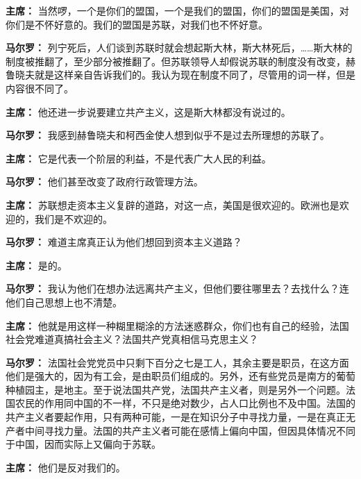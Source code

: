 \begin{list}{}
\item[\textbf{主席：}] 当然啰，一个是你们的盟国，一个是我们的盟国，你们的盟国是美国，对你们是不怀好意的。我们的盟国是苏联，对我们也不怀好意。

\item[\textbf{马尔罗：}] 列宁死后，人们谈到苏联时就会想起斯大林，斯大林死后，……斯大林的制度被推翻了，至少部分被推翻了。但苏联领导人却假说苏联的制度没有改变，赫鲁晓夫就是这样亲自告诉我们的。我认为现在制度不同了，尽管用的词一样，但是内容很不同了。

\item[\textbf{主席：}] 他还进一步说要建立共产主义，这是斯大林都没有说过的。

\item[\textbf{马尔罗：}] 我感到赫鲁晓夫和柯西金使人想到似乎不是过去所理想的苏联了。

\item[\textbf{主席：}] 它是代表一个阶层的利益，不是代表广大人民的利益。

\item[\textbf{马尔罗：}] 他们甚至改变了政府行政管理方法。

\item[\textbf{主席：}] 苏联想走资本主义复辟的道路，对这一点，美国是很欢迎的。欧洲也是欢迎的，我们是不欢迎的。

\item[\textbf{马尔罗：}] 难道主席真正认为他们想回到资本主义道路？

\item[\textbf{主席：}] 是的。

\item[\textbf{马尔罗：}] 我认为他们在想办法远离共产主义，但他们要往哪里去？去找什么？连他们自己思想上也不清楚。

\item[\textbf{主席：}] 他就是用这样一种糊里糊涂的方法迷惑群众，你们也有自己的经验，法国社会党难道真搞社会主义？法国共产党真相信马克思主义？

\item[\textbf{马尔罗：}] 法国社会党党员中只剩下百分之七是工人，其余主要是职员，在这方面他们是强大的，因为有工会，是由职员们组成的。另外，还有些党员是南方的葡萄种植园主，是地主。至于说法国共产党，法国共产主义者，则是另外一个问题。法国农民的作用同中国的不一样，不只是绝对数少，占人口比例也不及中国。法国的共产主义者要起作用，只有两种可能，一是在知识分子中寻找力量，一是在真正无产者中间寻找力量。法国的共产主义者可能在感情上偏向中国，但因具体情况不同于中国，因而实际上又偏向于苏联。

\item[\textbf{主席：}] 他们是反对我们的。


\end{list}
